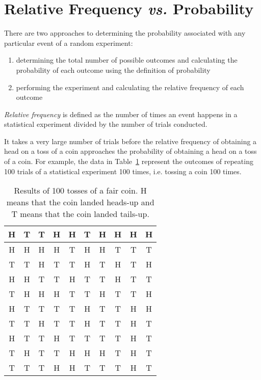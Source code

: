 \documentclass[10pt,a4paper,titlepage,twoside,openright]{report}
\begin{document}
\section{Relative Frequency \textit{vs.} Probability}

There are two approaches to determining the probability associated with any particular event of a random experiment:
\begin{enumerate}
\item determining the total number of possible outcomes and calculating the probability of each outcome using the definition of probability
\item performing the experiment and calculating the relative frequency of each outcome
\end{enumerate}

\textit{Relative frequency} is defined as the number of times an event happens in a statistical experiment divided by the number of trials conducted.

It takes a very large number of trials before the relative frequency of obtaining a head on a toss of a coin approaches the probability of obtaining a head on a toss of a coin. For example, the data in Table~\ref{tab:mdat:p:dataset1} represent the outcomes of repeating 100 trials of a statistical experiment 100 times, i.e. tossing a coin 100 times.

\begin{table}[htb]
\begin{center}
\begin{tabular}{|c|c|c|c|c|c|c|c|c|c|}\hline
H & T & T & H & H & T & H & H & H & H\\\hline
H & H & H & H & T & H & H & T & T & T\\\hline
T & T & H & T & T & H & T & H & T & H\\\hline
H & H & T & T & H & T & T & H & T & T\\\hline
T & H & H & H & T & T & H & T & T & H\\\hline
H & T & T & T & T & H & T & T & H & H\\\hline
T & T & H & T & T & H & T & T & H & T\\\hline
H & T & T & H & T & T & T & T & H & T\\\hline
T & H & T & T & H & H & H & T & H & T\\\hline
T & T & T & H & H & T & T & T & H & T\\\hline\end{tabular}
\end{center}
\caption{Results of 100 tosses of a fair coin. H means that the coin landed heads-up and T means that the coin landed tails-up.}
\label{tab:mdat:p:dataset1}
\end{table}
\end{document}
